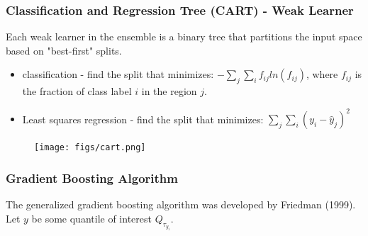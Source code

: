 \documentclass[t, pdftex]{beamer}
\makeatletter
\def\beamer@writeslidentry@miniframesoff{%
    \expandafter\beamer@ifempty\expandafter{\beamer@framestartpage}{}%
    {%
        \clearpage\beamer@notesactions%
    }
}
\newcommand*{\miniframesoff}{\let\beamer@writeslidentry=\beamer@writeslidentry@miniframesoff}
\makeatother
\begin{document}
\miniframesoff
\lastframe%


\begin{frame}[shrink=10, noframenumbering]
\frametitle{Classification and Regression Tree (CART) - Weak Learner}
Each weak learner in the ensemble is a binary tree that partitions the input space based on "best-first" splits.  
\begin{itemize}
\item classification - find the split that minimizes: $-\sum_j\sum_i f_{ij} ln(f_{ij})$, where $f_{ij}$ is the fraction of class label $i$ in the region $j$.
\item Least squares regression - find the split that minimizes: $\sum_j\sum_i(y_i - \hat y_{j})^2$
\end{itemize}

\begin{figure}[!htbp]
\centering
\texttt{[image: figs/cart.png]}
\label{model_overview}
\end{figure}
\end{frame}

\begin{frame}[shrink=20]
\frametitle{Gradient Boosting Algorithm}

The generalized gradient boosting algorithm was developed by Friedman (1999).
Let $y$ be some quantile of interest $Q_{\tau_{y_i}}$.
%
%
%
%
\end{frame}
\end{document}
